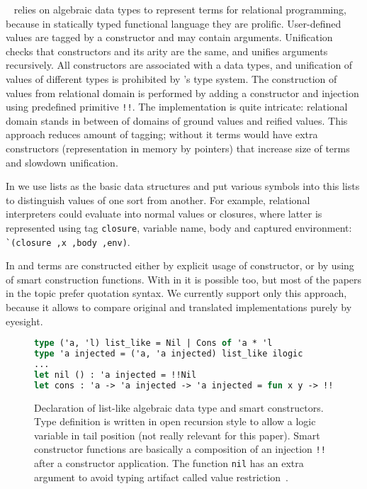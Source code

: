 \OCanren{}~\cite{OCanren} relies on algebraic data types to represent terms for relational programming, because in statically typed functional language \OCaml{} they are prolific.
User-defined values are tagged by a constructor and may contain arguments.
Unification checks that constructors and its arity are the same, and unifies arguments recursively.
All constructors are associated with a data types, and unification of values of different types is prohibited by \OCaml{}'s type system.
The construction of values from relational domain is performed by adding a constructor and injection using predefined primitive \verb=!!=.
The implementation is quite intricate: relational domain stands in between of domains of ground values and reified values.
This approach reduces amount of tagging; without it terms would have extra constructors (representation in memory by pointers) that increase size of terms and slowdown unification.

In \miniKanren{} we use lists as the basic data structures and put various symbols into this lists to distinguish values of one sort from another.
For example, relational interpreters could evaluate into normal values or closures, where latter is represented using tag \verb=closure=, variable name, body and captured environment: \verb=`(closure ,x ,body ,env)=.

In \Klogic{} and \OCanren{} terms are constructed either by explicit usage of constructor, or by using of smart construction functions.
With  \miniKanren{} in \Scheme{} it is possible too, but most of the papers in the topic prefer quotation syntax.
We currently support only this approach, because it allows to compare original and translated implementations purely by eyesight.

\begin{figure}
\begin{lstlisting}[language=ocaml]
type ('a, 'l) list_like = Nil | Cons of 'a * 'l
type 'a injected = ('a, 'a injected) list_like ilogic
...
let nil () : 'a injected = !!Nil
let cons : 'a -> 'a injected -> 'a injected = fun x y -> !!(Cons (x, y))
\end{lstlisting}
\caption{Declaration of list-like algebraic data type and smart constructors.
Type definition is written in open recursion style to allow a logic variable in tail position (not really relevant for this paper).
Smart constructor functions are basically a composition of an injection \texttt{!!} after a constructor application.
The function \texttt{nil} has an extra argument to avoid typing artifact called value restriction~\cite{Relaxed2004}.
}
\end{figure}

